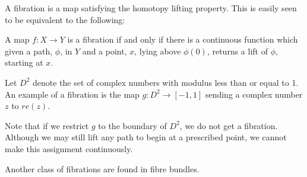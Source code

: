 \documentclass[12pt]{article}
\begin{document}
A fibration is a map satisfying the homotopy lifting property.  This is easily seen to be equivalent to the following:

A map $f:X \to Y$ is a fibration if and only if there is a continuous function which given a path, $\phi$, in $Y$ and a point, $x$, lying above $\phi(0)$, returns a lift of $\phi$, starting at $x$.

Let $D^2$ denote the set of complex numbers with modulus less than or equal to 1. An example of a fibration is the map $g: D^2 \to [-1,1]$ sending a complex number $z$ to $re(z)$. 

Note that if we restrict $g$ to the boundary of $D^2$, we do not get a fibration.  Although we may still lift any path to begin at a prescribed point, we cannot make this assignment continuously.

Another class of fibrations are found in fibre bundles.
\end{document}
